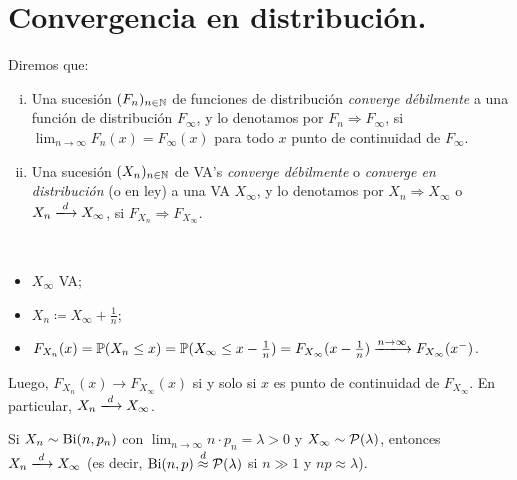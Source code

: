 
\section{Convergencia en distribución.}

\begin{definition}
	Diremos que:
	\begin{enumerate}[i)]
		\item Una sucesión $(F_{n})_{n \in \mathbb{N}}$ de funciones de distribución \textit{converge débilmente} a una función de distribución $F_{\infty}$, y lo denotamos por $F_{n} \Longrightarrow F_{\infty}$, si $\lim_{n \to \infty} F_{n}(x) = F_{\infty}(x)$ para todo $x$ punto de continuidad de $F_{\infty}$.

		\item Una sucesión $(X_{n})_{n \in \mathbb{N}}$ de VA's \textit{converge débilmente} o \textit{converge en distribución} (o en ley) a una VA $X_{\infty}$, y lo denotamos por $X_{n} \Longrightarrow X_{\infty}$ o $X_{n} \xlongrightarrow{d} X_{\infty}$, si $F_{X_{n}} \Longrightarrow F_{X_{\infty}}$.
	\end{enumerate}
\end{definition}

\begin{eg}~
	\begin{itemize}
		\item $X_{\infty}$ VA;

		\item $X_{n} \coloneq X_{\infty} + \frac{1}{n}$;

		\item $F_{X_{n}}(x) = \mbb{P}(X_{n} \leq x) = \mbb{P}(X_{\infty} \leq x - \frac{1}{n}) = F_{X_{\infty}}(x - \frac{1}{n}) \xlongrightarrow{n \to \infty} F_{X_{\infty}}(x^{-})$.
	\end{itemize}
	Luego, $F_{X_{n}}(x) \longrightarrow F_{X_{\infty}}(x)$ si y solo si $x$ es punto de continuidad de $F_{X_{\infty}}$. En particular, $X_{n} \xlongrightarrow{d} X_{\infty}$.
\end{eg}

\begin{eg}
	Si $X_{n} \sim \operatorname{Bi}(n, p_{n})$ con $\lim_{n \to \infty} n \cdot p_{n} = \lambda > 0$ y $X_{\infty} \sim \mathcal{P}(\lambda)$, entonces $X_{n} \xlongrightarrow{d} X_{\infty}$ (es decir, $\operatorname{Bi}(n,p) \stackrel{d}{\approx} \mathcal{P}(\lambda)$ si $n \gg 1$ y $np \approx \lambda$).
\end{eg}

